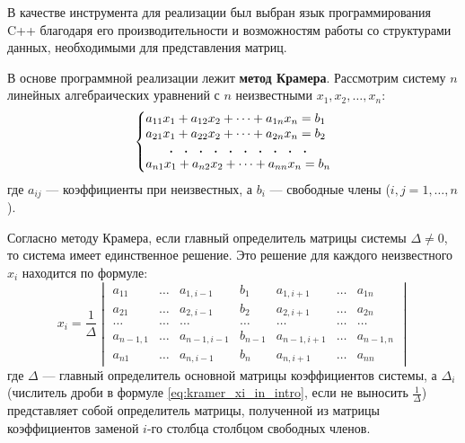 \documentclass[12pt,a4paper]{scrartcl}
\begin{document}
	В качестве инструмента для реализации был выбран язык программирования C++ благодаря его производительности и возможностям работы со структурами данных, необходимыми для представления матриц.
	
	\vspace{1ex} 
	
	В основе программной реализации лежит \textbf{метод Крамера}. Рассмотрим систему $n$ линейных алгебраических уравнений с $n$ неизвестными $x_1, x_2, \dots, x_n$:
	\[
	\left\{ 
	\begin{array}{@{}l@{}} 
		a_{11}x_1 + a_{12}x_2 + \dots + a_{1n}x_n = b_1 \\
		a_{21}x_1 + a_{22}x_2 + \dots + a_{2n}x_n = b_2 \\
		\multicolumn{1}{@{}c@{}}{\text{\Large$. \mspace{10mu} . \mspace{10mu} . \mspace{10mu} . \mspace{10mu} . \mspace{10mu} . \mspace{10mu} . \mspace{10mu} . \mspace{10mu} . \mspace{10mu} .$}} \\ 
		a_{n1}x_1 + a_{n2}x_2 + \dots + a_{nn}x_n = b_n
	\end{array}
	\right. 
	\]
	где $a_{ij}$ --- коэффициенты при неизвестных, а $b_i$ --- свободные члены ($i, j = 1, \dots, n$).
	
	Согласно методу Крамера, если главный определитель матрицы системы $\Delta \neq 0$, то система имеет единственное решение. Это решение для каждого неизвестного $x_i$ находится по формуле:
	\begin{equation}\label{eq:kramer} 
		x_i = \frac{1}{\Delta} \begin{vmatrix} 
			a_{11}   & \dots & a_{1,i-1}   & b_1    & a_{1,i+1}   & \dots & a_{1n}   \\
			a_{21}   & \dots & a_{2,i-1}   & b_2    & a_{2,i+1}   & \dots & a_{2n}   \\
			\dots    & \dots & \dots      & \dots  & \dots      & \dots  & \dots    \\ 
			a_{n-1,1} & \dots & a_{n-1,i-1} & b_{n-1} & a_{n-1,i+1} & \dots & a_{n-1,n} \\
			a_{n1}   & \dots & a_{n,i-1}   & b_n    & a_{n,i+1}   & \dots & a_{nn}   
		\end{vmatrix}
	\end{equation}
	где $\Delta$ --- главный определитель основной матрицы коэффициентов системы, а $\Delta_i$ (числитель дроби в формуле \eqref{eq:kramer_xi_in_intro}, если не выносить $\frac{1}{\Delta}$) представляет собой определитель матрицы, полученной из матрицы коэффициентов заменой $i$-го столбца столбцом свободных членов.
	
\end{document}

